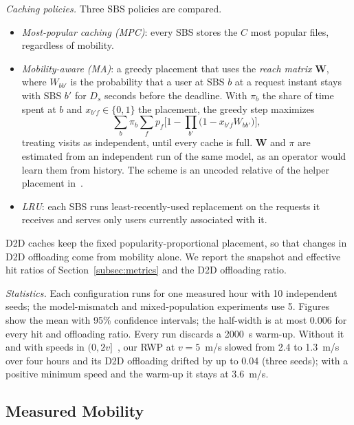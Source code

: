 \emph{Caching policies.} Three SBS policies are compared.
\begin{itemize}
\item \emph{Most-popular caching (MPC)}: every SBS stores the $C$ most popular files, regardless of mobility.
\item \emph{Mobility-aware (MA)}: a greedy placement that uses the \emph{reach matrix} $\mathbf{W}$, where $W_{bb'}$ is the probability that a user at SBS $b$ at a request instant stays with SBS $b'$ for $D_s$ seconds before the deadline. With $\pi_b$ the share of time spent at $b$ and $x_{b'f}\in\{0,1\}$ the placement, the greedy step maximizes
\begin{equation}
\sum_{b}\pi_b\sum_{f}p_f\Big[1-\prod_{b'}\big(1-x_{b'f}W_{bb'}\big)\Big],
\label{eq:maobj}
\end{equation}
treating visits as independent, until every cache is full. $\mathbf{W}$ and $\pi$ are estimated from an independent run of the same model, as an operator would learn them from history. The scheme is an uncoded relative of the helper placement in~\cite{poularakis2013exploiting}.
\item \emph{LRU}: each SBS runs least-recently-used replacement on the requests it receives and serves only users currently associated with it.
\end{itemize}
D2D caches keep the fixed popularity-proportional placement, so that changes in D2D offloading come from mobility alone. We report the snapshot and effective hit ratios of Section~\ref{subsec:metrics} and the D2D offloading ratio.

\emph{Statistics.} Each configuration runs for one measured hour with 10 independent seeds; the model-mismatch and mixed-population experiments use 5. Figures show the mean with 95\% confidence intervals; the half-width is at most 0.006 for every hit and offloading ratio. Every run discards a 2000~s warm-up. Without it and with speeds in $(0,2v]$~\cite{yoon2003rwp}, our RWP at $v=5$~m/s slowed from 2.4 to 1.3~m/s over four hours and its D2D offloading drifted by up to 0.04 (three seeds); with a positive minimum speed and the warm-up it stays at 3.6~m/s.

\subsection{Measured Mobility}
\label{subsec:res-measured}

